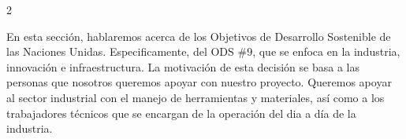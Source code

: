 \begin{multicols*}{2}

\begin{center}
  
  \label{fig:introduccion}
\end{center}

En esta sección, hablaremos acerca de los Objetivos de Desarrollo Sostenible de las Naciones Unidas. Especificamente, del ODS \#9, que se enfoca en la industria, innovación e infraestructura. La motivación de esta decisión se basa a las personas que nosotros queremos apoyar con nuestro proyecto. Queremos apoyar al sector industrial con el manejo de herramientas y materiales, así como a los trabajadores técnicos que se encargan de la operación del dia a día de la industria.

\end{multicols*}
